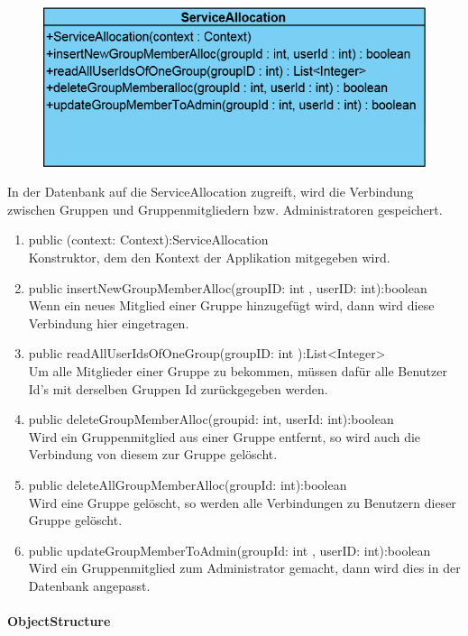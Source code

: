 \begin{figure}[H]
	\includegraphics[scale = .5]{res/umlClasses/ServiceAllocation.png} 
	\centering
\end{figure}
In der Datenbank auf die ServiceAllocation zugreift, wird die Verbindung zwischen Gruppen und Gruppenmitgliedern bzw. Administratoren gespeichert. 
\begin{enumerate}
	\item public (context: Context):ServiceAllocation\\
		Konstruktor, dem den Kontext der Applikation mitgegeben wird.
	\item public insertNewGroupMemberAlloc(groupID: int , userID: int):boolean\\
		Wenn ein neues Mitglied einer Gruppe hinzugefügt wird, dann wird diese Verbindung hier eingetragen.
	\item public readAllUserIdsOfOneGroup(groupID: int ):List<Integer> \\
		Um alle Mitglieder einer Gruppe zu bekommen, müssen dafür alle Benutzer Id's mit derselben Gruppen Id zurückgegeben werden.
	\item public deleteGroupMemberAlloc(groupid: int, userId: int):boolean \\
		Wird ein Gruppenmitglied aus einer Gruppe entfernt, so wird auch die Verbindung von diesem zur Gruppe gelöscht.
	\item public deleteAllGroupMemberAlloc(groupId: int):boolean \\
		Wird eine Gruppe gelöscht, so werden alle Verbindungen zu Benutzern dieser Gruppe gelöscht.
	\item public updateGroupMemberToAdmin(groupId: int , userID: int):boolean \\
		Wird ein Gruppenmitglied zum Administrator gemacht, dann wird dies in der Datenbank angepasst.
\end{enumerate}
	

\paragraph{ObjectStructure}

